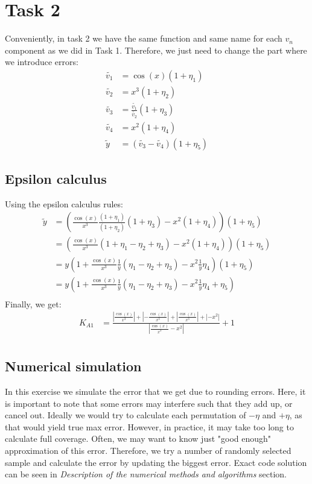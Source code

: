 \section{Task 2}
Conveniently, in task 2 we have the same function and same name for each $v_n$ 
component as we did in Task 1. Therefore, we just need to change the part where 
we introduce errors:
\begin{align*}
    \tilde{v_1} &= \cos(x) (1+\eta_1)\\ 
    \tilde{v_2} &= x^3(1+\eta_2)\\ 
    \tilde{v_3} &= \frac{\tilde{v_1}}{\tilde{v_2}}(1+\eta_3) \\ 
    \tilde{v_4} &= x^2 (1+\eta_4) \\
    \tilde{y} &= (\tilde{v_3} - \tilde{v_4})(1+\eta_5)
\end{align*}
\subsection{Epsilon calculus}
Using the epsilon calculus rules:
\begin{align*}
    \tilde{y} &= \left(
    \frac{\cos(x)}{x^3}\frac{(1+\eta_1)}{(1+\eta_2)}(1+\eta_3) - x^2(1+\eta_4)
    \right) (1+\eta_5) \\
    &= \left(\frac{\cos(x)}{x^3}(1+\eta_1-\eta_2+\eta_3) - x^2(1+\eta_4)\right)(1+\eta_5)\\
    &= y \left(1+ \frac{\cos(x)}{x^3}\frac1y(\eta_1-\eta_2+\eta_3) - x^2\frac1y\eta_4 \right)(1+\eta_5) \\
    &= y \left(1+ \frac{\cos(x)}{x^3}\frac1y(\eta_1-\eta_2+\eta_3) - x^2\frac1y\eta_4 + \eta_5\right) \\
\end{align*}
Finally, we get:
\begin{align*}
K_{A1} &= \displaystyle\frac{
    \left|\frac{\cos(x)}{x^3}\right| + 
    \left|-\frac{\cos(x)}{x^3}\right| +
    \left|\frac{\cos(x)}{x^3}\right| + 
    \left|-x^2\right|}
{\left|\frac{\cos(x)}{x^3} - x^2\right|} + 1\\
\end{align*}

\subsection{Numerical simulation}
In this exercise we simulate the error that we get due to rounding errors.
Here, it is important to note that some errors may interfere such that they add
up, or cancel out. Ideally we would try to calculate each permutation of
$-\eta$ and $+\eta$, as that would yield true max error. However, in practice,
it may take too long to calculate full coverage. Often, we may want to know
just "good enough" approximation of this error. Therefore, we try a number of
randomly selected sample and calculate the error by updating the biggest error.
Exact code solution can be seen in \textit{Description of the numerical methods
and algorithms} section.

